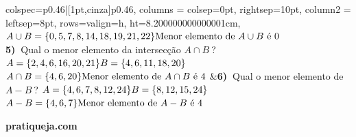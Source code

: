 \documentclass[12pt,twoside]{article}
\newcommand{\BI}[1]{\textbf{\textcolor{iris}{#1}}}
\begin{document}
\begin{tblr}{
colspec={p{0.46\textwidth}|[1pt,cinza]p{0.46\textwidth}},
columns = {colsep=0pt, rightsep=10pt},
column{2} = {leftsep=8pt},
rows={valign=h, ht=8.200000000000001cm},
}
{$A \cup B = \{0,5,7,8,14,18,19,21,22\} \\\text{Menor elemento de}~ A \cup B \text{ é }0$} \\ 
\BI{5)~}{Qual o menor elemento da intersecção \(A \cap B ~\)?}\vspace{5px}  \newline 
{ $A=\{2,4,6,16,20,21\}\newline B=\{4,6,11,18,20\}$} \vspace{5px} \newline 
{$A \cap B = \{4,6,20\} \\\text{Menor elemento de}~ A \cap B \text{ é }4$} &\BI{6)~}{Qual o menor elemento de \(A - B ~\)?}\vspace{5px}  \newline 
{ $A=\{4,6,7,8,12,24\}\newline B=\{8,12,15,24\}$} \vspace{5px} \newline 
{$A - B = \{4,6,7\} \\\text{Menor elemento de}~ A - B \text{ é }4$} \\ 
\end{tblr}

\vfill
\begin{flushright}
\setlength{\tabcolsep}{0em}
\setlength\parindent{0pt}
\footnotesize \textbf{pratiqueja.com}
\end{flushright}
\end{document}
